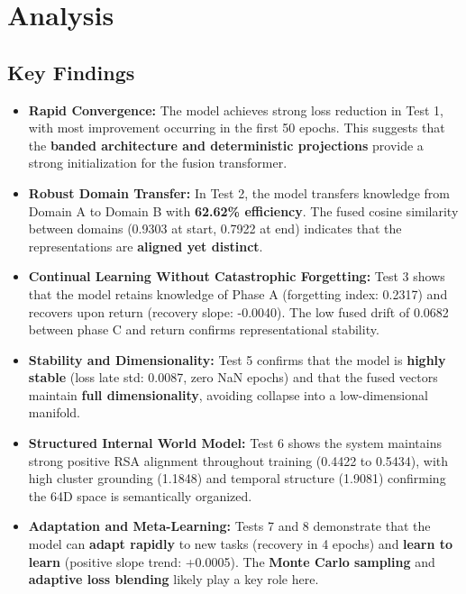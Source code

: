 \documentclass[12pt]{article}
\begin{document}
\section{Analysis}
\label{sec:analysis}

\subsection{Key Findings}
\label{subsec:findings}

\begin{itemize}
    \item \textbf{Rapid Convergence:}
    The model achieves strong loss reduction in Test 1, with most
    improvement occurring in the first 50 epochs. This suggests that
    the \textbf{banded architecture and deterministic projections}
    provide a strong initialization for the fusion transformer.

    \item \textbf{Robust Domain Transfer:}
    In Test 2, the model transfers knowledge from Domain A to Domain B
    with \textbf{62.62\% efficiency}. The fused cosine similarity
    between domains (0.9303 at start, 0.7922 at end) indicates that
    the representations are \textbf{aligned yet distinct}.

    \item \textbf{Continual Learning Without Catastrophic Forgetting:}
    Test 3 shows that the model retains knowledge of Phase A
    (forgetting index: 0.2317) and recovers upon return
    (recovery slope: -0.0040). The low fused drift of 0.0682 between
    phase C and return confirms representational stability.

    \item \textbf{Stability and Dimensionality:}
    Test 5 confirms that the model is \textbf{highly stable} (loss
    late std: 0.0087, zero NaN epochs) and that the fused vectors
    maintain \textbf{full dimensionality}, avoiding collapse into a
    low-dimensional manifold.

    \item \textbf{Structured Internal World Model:}
    Test 6 shows the system maintains strong positive RSA alignment
    throughout training (0.4422 to 0.5434), with high cluster
    grounding (1.1848) and temporal structure (1.9081) confirming
    the 64D space is semantically organized.

    \item \textbf{Adaptation and Meta-Learning:}
    Tests 7 and 8 demonstrate that the model can \textbf{adapt
    rapidly} to new tasks (recovery in 4 epochs) and \textbf{learn to
    learn} (positive slope trend: +0.0005). The \textbf{Monte Carlo
    sampling} and \textbf{adaptive loss blending} likely play a key
    role here.


\end{itemize}
\end{document}

